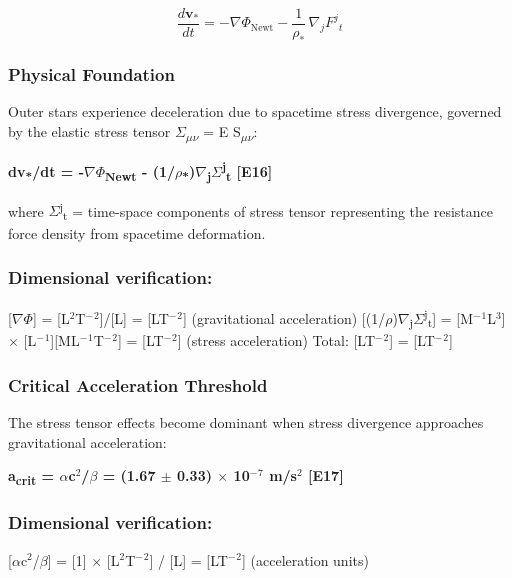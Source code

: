 \documentclass[11pt,a4paper]{article}
\begin{document}
\[
\frac{d\mathbf{v}_*}{dt} = -\nabla\Phi_\mathrm{Newt} - \frac{1}{\rho_*}\,\nabla_j F^j{}_t
\]

\subsubsection{Physical Foundation}
Outer stars experience deceleration due to spacetime stress divergence, governed by the elastic stress tensor $\Sigma$\textsubscript{$\mu$$\nu$} = E S\textsubscript{$\mu$$\nu$}:

\textbf{dv\textsubscript{*}/dt = -$\nabla$$\Phi$\textsubscript{Newt} - (1/\allowbreak{}$\rho$\textsubscript{*})$\nabla$\textsubscript{j}$\Sigma$\textsuperscript{j}\textsubscript{t} [E16]}

where $\Sigma$\textsuperscript{j}\textsubscript{t} = time-space components of stress tensor representing the resistance force density from spacetime deformation.

\begin{mdframed}[linecolor=accent,linewidth=0.5pt,backgroundcolor=callout-bg,leftline=true,rightline=true,topline=true,bottomline=true,innerleftmargin=8pt,innerrightmargin=8pt,innertopmargin=6pt,innerbottommargin=6pt]
\subsubsection{Dimensional verification:}
[$\nabla$$\Phi$] = [L$^{2}$T$^{-}$$^{2}$]/[L] = [LT$^{-}$$^{2}$] (gravitational acceleration)\newline{}
[(1/\allowbreak{}$\rho$)$\nabla$\textsubscript{j}$\Sigma$\textsuperscript{j}\textsubscript{t}] = [M$^{-}$$^{1}$L$^{3}$] $\times$ [L$^{-}$$^{1}$][ML$^{-}$$^{1}$T$^{-}$$^{2}$] = [LT$^{-}$$^{2}$] (stress acceleration)\newline{}
Total: [LT$^{-}$$^{2}$] = [LT$^{-}$$^{2}$] \checkmark{}
\end{mdframed}

\subsubsection{Critical Acceleration Threshold}
The stress tensor effects become dominant when stress divergence approaches gravitational acceleration:

\textbf{a\textsubscript{crit} = $\alpha$c$^{2}$/$\beta$ = (1.67 $\pm$ 0.33) $\times$ 10$^{-}$$^{7}$ m/\allowbreak{}s$^{2}$ [E17]}

\begin{mdframed}[linecolor=accent,linewidth=0.5pt,backgroundcolor=callout-bg,leftline=true,rightline=true,topline=true,bottomline=true,innerleftmargin=8pt,innerrightmargin=8pt,innertopmargin=6pt,innerbottommargin=6pt]
\subsubsection{Dimensional verification:}
[$\alpha$c$^{2}$/$\beta$] = [1] $\times$ [L$^{2}$T$^{-}$$^{2}$] / [L] = [LT$^{-}$$^{2}$] \checkmark{} (acceleration units)
\end{mdframed}
\end{document}
